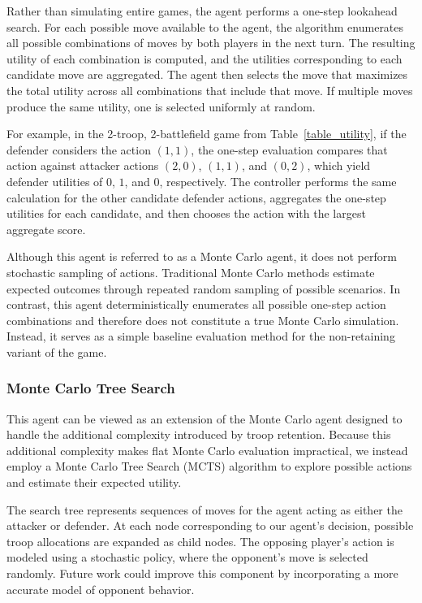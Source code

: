 \documentclass[letterpaper, 10 pt, conference]{ieeeconf}  %
\begin{document}
Rather than simulating entire games, the agent performs a one-step lookahead search. For each possible move available to the agent, the algorithm enumerates all possible combinations of moves by both players in the next turn. The resulting utility of each combination is computed, and the utilities corresponding to each candidate move are aggregated. The agent then selects the move that maximizes the total utility across all combinations that include that move. If multiple moves produce the same utility, one is selected uniformly at random.

For example, in the 2-troop, 2-battlefield game from Table~\ref{table_utility}, if the defender considers the action $(1,1)$, the one-step evaluation compares that action against attacker actions $(2,0)$, $(1,1)$, and $(0,2)$, which yield defender utilities of $0$, $1$, and $0$, respectively. The controller performs the same calculation for the other candidate defender actions, aggregates the one-step utilities for each candidate, and then chooses the action with the largest aggregate score.

Although this agent is referred to as a Monte Carlo agent, it does not perform stochastic sampling of actions. Traditional Monte Carlo methods estimate expected outcomes through repeated random sampling of possible scenarios. In contrast, this agent deterministically enumerates all possible one-step action combinations and therefore does not constitute a true Monte Carlo simulation. Instead, it serves as a simple baseline evaluation method for the non-retaining variant of the game.
\subsubsection{Monte Carlo Tree Search}
This agent can be viewed as an extension of the Monte Carlo agent designed to handle the additional complexity introduced by troop retention. Because this additional complexity makes flat Monte Carlo evaluation impractical, we instead employ a Monte Carlo Tree Search (MCTS) algorithm to explore possible actions and estimate their expected utility.

The search tree represents sequences of moves for the agent acting as either the attacker or defender. At each node corresponding to our agent's decision, possible troop allocations are expanded as child nodes. The opposing player's action is modeled using a stochastic policy, where the opponent's move is selected randomly. Future work could improve this component by incorporating a more accurate model of opponent behavior.
\end{document}
